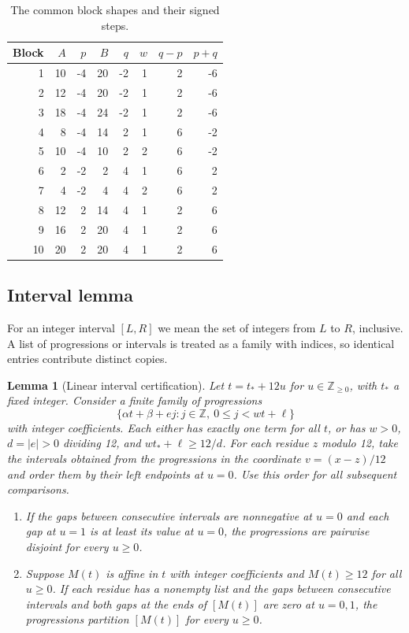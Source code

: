 \documentclass[11pt]{amsart}
\newtheorem{lemma}{Lemma}[section]
\begin{document}
\begin{table}[htbp]
\centering
\caption{The common block shapes and their signed steps.}
\label{tab:shapes}
\begin{tabular}{@{}rrrrrrrr@{}}
\toprule
Block & \(A\) & \(p\) & \(B\) & \(q\) & \(w\) & \(q-p\) & \(p+q\)\\
\midrule
1 & 10 & -4 & 20 & -2 & 1 & 2 & -6\\
2 & 12 & -4 & 20 & -2 & 1 & 2 & -6\\
3 & 18 & -4 & 24 & -2 & 1 & 2 & -6\\
4 & 8 & -4 & 14 & 2 & 1 & 6 & -2\\
5 & 10 & -4 & 10 & 2 & 2 & 6 & -2\\
6 & 2 & -2 & 2 & 4 & 1 & 6 & 2\\
7 & 4 & -2 & 4 & 4 & 2 & 6 & 2\\
8 & 12 & 2 & 14 & 4 & 1 & 2 & 6\\
9 & 16 & 2 & 20 & 4 & 1 & 2 & 6\\
10 & 20 & 2 & 20 & 4 & 1 & 2 & 6\\
\bottomrule
\end{tabular}
\end{table}

\subsection{Interval lemma}

For an integer interval \([L,R]\) we mean the set of integers
from \(L\) to \(R\), inclusive. A list of progressions or
intervals is treated as a family with indices, so identical
entries contribute distinct copies.

\begin{lemma}[Linear interval certification]\label{lem:certify}
Let \(t=t_*+12u\) for \(u\in\mathbb Z_{\ge0}\), with \(t_*\)
a fixed integer. Consider a finite family of progressions
\[
  \{\alpha t+\beta+ej:j\in\mathbb Z,\ 0\le j<wt+\ell\}
\]
with integer coefficients. Each either has exactly one term
for all \(t\), or has \(w>0\), \(d=|e|>0\) dividing 12, and
\(wt_*+\ell\ge12/d\). For each residue \(z\) modulo 12, take
the intervals obtained from the progressions in the coordinate
\(v=(x-z)/12\) and order them by their left endpoints at \(u=0\).
Use this order for all subsequent comparisons.

\begin{enumerate}
\item If the gaps between consecutive intervals are nonnegative
at \(u=0\) and each gap at \(u=1\) is at least its value at
\(u=0\), the progressions are pairwise disjoint for every
\(u\ge0\).
\item Suppose \(M(t)\) is affine in \(t\) with integer coefficients
and \(M(t)\ge12\) for all \(u\ge0\). If each residue has a
nonempty list and the gaps between consecutive intervals and
both gaps at the ends of \([M(t)]\) are zero at \(u=0,1\),
the progressions partition \([M(t)]\) for every \(u\ge0\).
\end{enumerate}
\end{lemma}
\end{document}
